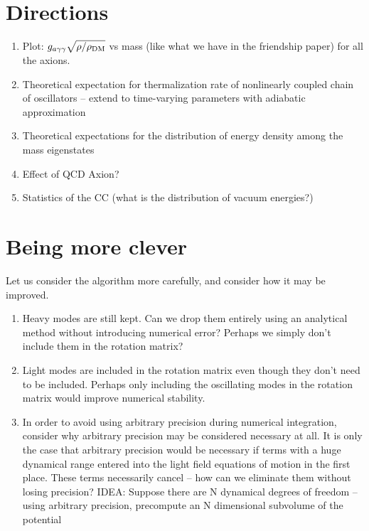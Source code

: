 \documentclass{article}
\begin{document}
\section{Directions}
\begin{enumerate}
    \item Plot: $g_{a\gamma\gamma}\sqrt{\rho/\rho_{\rm DM}}$ vs mass (like what we have in the friendship paper) for all the axions.
    \item Theoretical expectation for thermalization rate of nonlinearly coupled chain of oscillators -- extend to time-varying parameters with adiabatic approximation
    \item Theoretical expectations for the distribution of energy density among the mass eigenstates
    \item Effect of QCD Axion?
    \item Statistics of the CC (what is the distribution of vacuum energies?)
\end{enumerate}

\section{Being more clever}
Let us consider the algorithm more carefully, and consider how it may be improved.
\begin{enumerate}
    \item Heavy modes are still kept. Can we drop them entirely using an analytical method without introducing numerical error? Perhaps we simply don't include them in the rotation matrix?
    \item Light modes are included in the rotation matrix even though they don't need to be included. Perhaps only including the oscillating modes in the rotation matrix would improve numerical stability.
    \item In order to avoid using arbitrary precision during numerical integration, consider why arbitrary precision may be considered necessary at all. It is only the case that arbitrary precision would be necessary if terms with a huge dynamical range entered into the light field equations of motion in the first place. These terms necessarily cancel -- how can we eliminate them without losing precision? IDEA: Suppose there are N dynamical degrees of freedom -- using arbitrary precision, precompute an N dimensional subvolume of the potential
\end{enumerate}


\end{document}
